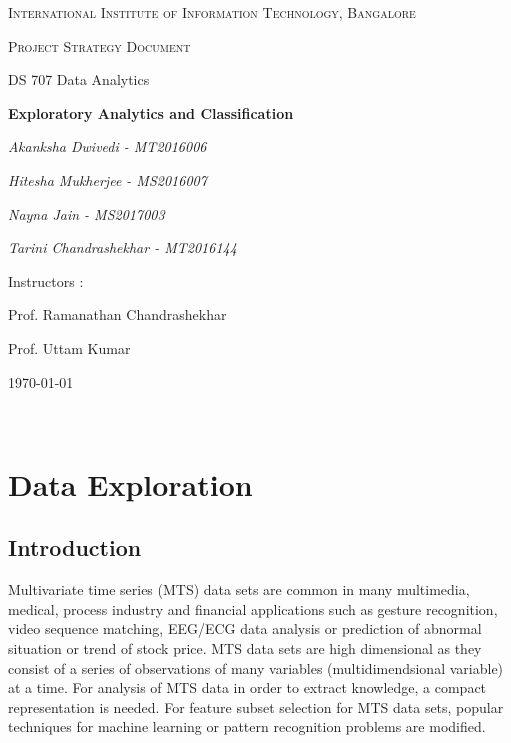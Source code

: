 \documentclass{article}
\begin{document}
\begin{titlepage}
	\centering
	{\scshape\LARGE International Institute of Information Technology, Bangalore \par}
	\vspace{1cm}
	{\scshape\Large Project Strategy Document\par}
	{\Large  DS 707 Data Analytics\par}
	\vspace{1.5cm}
	{\huge\bfseries Exploratory Analytics and Classification \par}
	\vspace{2cm}
	{\Large\itshape Akanksha Dwivedi - MT2016006\par}
	{\Large\itshape Hitesha Mukherjee - MS2016007\par}
	{\Large\itshape Nayna Jain - MS2017003\par}
	{\Large\itshape Tarini Chandrashekhar - MT2016144\par}
	\vfill
	Instructors : \par
	Prof. Ramanathan Chandrashekhar
	\par
	Prof. Uttam Kumar

	\vfill
	{\large \today\par}
\end{titlepage}

\newpage

\tableofcontents

\newpage
\justify

\

\section{Data Exploration}

\subsection {Introduction}
Multivariate time series (MTS) data sets are common in many multimedia, medical, process industry and financial applications such as gesture recognition, video sequence matching, EEG/ECG data analysis or prediction of abnormal situation or trend of stock price. MTS data sets are high dimensional as they consist of a series of observations of many variables (multidimendsional variable) at a time.
For analysis of MTS data in order to extract knowledge, a compact representation is needed. For feature subset selection for MTS data sets, popular techniques for machine learning or pattern recognition problems are modified.\newline
\end{document}
